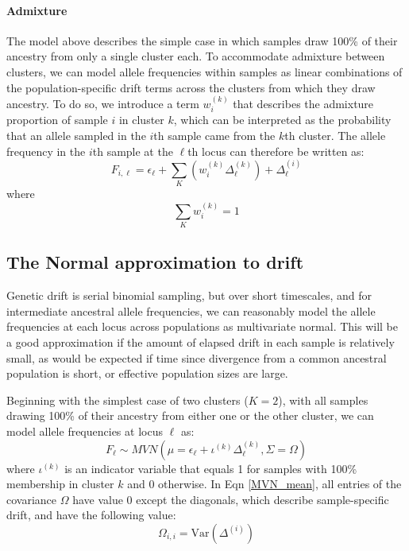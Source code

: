 \documentclass[12pt]{article}
\begin{document}
\paragraph{Admixture} 
The model above describes the simple case 
in which samples draw 100\% of their ancestry from only a single cluster each. 
To accommodate admixture between clusters, 
we can model allele frequencies within samples as linear combinations of the population-specific 
drift terms across the clusters from which they draw ancestry.
To do so, we introduce a term $w^{(k)}_{i}$ that describes the admixture proportion of sample $i$ in cluster $k$,
which can be interpreted as the probability that an allele sampled in the $i$th sample came from the $k$th cluster.
The allele frequency in the $i$th sample at the $\ell$th locus can therefore be written as:
%
\begin{equation}
F_{i,\ell} = \epsilon_{\ell} + \sum\limits_{K} \left( w^{(k)}_{i} \Delta^{(k)}_{\ell} \right) + \Delta^{(i)}_{\ell}	
\label{drift_terms_admix}
\end{equation}
%
where
%
\begin{equation}
\sum\limits_{K}w^{(k)}_{i} = 1
\end{equation}

\subsection{The Normal approximation to drift}
Genetic drift is serial binomial sampling, 
but over short timescales, and for intermediate ancestral allele frequencies, 
we can reasonably model the allele frequencies at each locus across populations as multivariate normal.
This will be a good approximation if the amount of elapsed drift in each sample is relatively small,
as would be expected if time since divergence from a common ancestral population is short,
or effective population sizes are large.

Beginning with the simplest case of two clusters ($K=2$),
with all samples drawing 100\% of their ancestry from either one or the other cluster, 
we can model allele frequencies at locus $\ell$ as:
%
\begin{equation}
F_{\ell} \sim MVN\left(\mu = \epsilon_{\ell} + \iota^{(k)}\Delta_{\ell}^{(k)}, \Sigma = \Omega	\right)
\label{MVN_mean}
\end{equation}
%
where $\iota^{(k)}$ is an indicator variable that equals 1 for samples with 100\% membership in cluster $k$
and 0 otherwise.
In Eqn \eqref{MVN_mean}, all entries of the covariance $\Omega$ have value 0 except the diagonals,
which describe sample-specific drift, and have the following value:
%
\begin{equation}
\Omega_{i,i} = \text{Var}\left( \Delta^{(i)} \right)
\label{MVN_mean_diag}
\end{equation}
\end{document}
